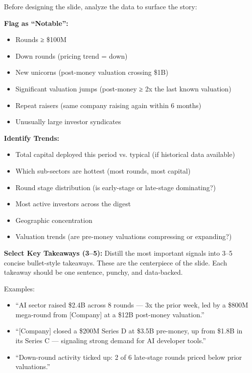 \documentclass[11pt]{article}
\begin{document}
Before designing the slide, analyze the data to surface the story:


\textbf{Flag as ``Notable'':}

\begin{itemize}[leftmargin=*,itemsep=2pt,topsep=2pt]
\item {} Rounds ≥ \$100M
\item {} Down rounds (pricing trend = down)
\item {} New unicorns (post-money valuation crossing \$1B)
\item {} Significant valuation jumps (post-money ≥ 2x the last known valuation)
\item {} Repeat raisers (same company raising again within 6 months)
\item {} Unusually large investor syndicates
\end{itemize}

\textbf{Identify Trends:}

\begin{itemize}[leftmargin=*,itemsep=2pt,topsep=2pt]
\item {} Total capital deployed this period vs. typical (if historical data available)
\item {} Which sub-sectors are hottest (most rounds, most capital)
\item {} Round stage distribution (is early-stage or late-stage dominating?)
\item {} Most active investors across the digest
\item {} Geographic concentration
\item {} Valuation trends (are pre-money valuations compressing or expanding?)
\end{itemize}

\textbf{Select Key Takeaways (3–5):} Distill the most important signals into 3–5 concise bullet-style takeaways. These are the centerpiece of the slide. Each takeaway should be one sentence, punchy, and data-backed.


Examples:

\begin{itemize}[leftmargin=*,itemsep=2pt,topsep=2pt]
\item {} ``AI sector raised \$2.4B across 8 rounds — 3x the prior week, led by a \$800M mega-round from [Company] at a \$12B post-money valuation.''
\item {} ``[Company] closed a \$200M Series D at \$3.5B pre-money, up from \$1.8B in its Series C — signaling strong demand for AI developer tools.''
\item {} ``Down-round activity ticked up: 2 of 6 late-stage rounds priced below prior valuations.''
\end{itemize}
\end{document}
